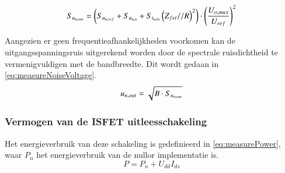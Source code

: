\begin{equation}\label{eq:measureNoiseFull}
    S_{u_{{n,out}}} = \left(S_{u_{{n,ref}}} + S_{u_{{n,n}}} + S_{i_{{n,in}}}\left(Z_{fet} // R\right)^2\right) \cdot \left(\frac{U_{o,max}}{U_{ref}}\right)^2
    \tagaddtext{[\si{\volt\squared\per\hertz}]}
\end{equation}

Aangezien er geen frequentieafhankelijkheden voorkomen kan de uitgangsspanningsruis uitgerekend worden door de spectrale ruisdichtheid te vermenigvuldigen met de bandbreedte. Dit wordt gedaan in \cref{eq:measureNoiseVoltage}.
\begin{equation}\label{eq:measureNoiseVoltage}
    u_{n,out} = \sqrt{B \cdot S_{u_{{n,out}}}}
    \tagaddtext{[\si{\volt}]}
\end{equation}

\subsubsection{Vermogen van de ISFET uitleesschakeling}
Het energieverbruik van deze schakeling is gedefinieerd in \cref{eq:measurePower}, waar $P_n$ het energieverbruik van de nullor implementatie is.
\begin{equation}\label{eq:measurePower}
    P = P_n + U_{dd}I_{ds}
\end{equation}


